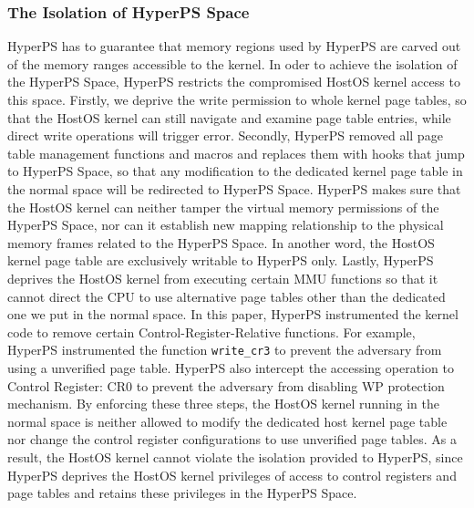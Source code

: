 \subsubsection{The Isolation of HyperPS Space}%
\label{ssub:the_isolation_of_hyperps_space}
HyperPS has to guarantee that memory regions used by HyperPS are carved out of the memory ranges accessible to the kernel.
In oder to achieve the isolation of the HyperPS Space, HyperPS restricts the compromised HostOS kernel access to this space. 
Firstly, we deprive the write permission to whole kernel page tables, 
so that the HostOS kernel can still navigate and examine page table entries, while direct write operations will trigger error. 
Secondly, HyperPS removed all page table management functions and macros and replaces them with hooks that jump to HyperPS Space, so that any modification to the dedicated kernel page table in the normal space will be redirected to HyperPS Space. 
HyperPS makes sure that the HostOS kernel can neither tamper the virtual memory permissions of the HyperPS Space, nor can it establish new mapping relationship to the physical memory frames related to the HyperPS Space. 
In another word, the HostOS kernel page table are exclusively writable to HyperPS only. 
Lastly, HyperPS deprives the HostOS kernel from executing certain MMU functions so that it cannot direct the CPU to use alternative page tables other than the dedicated one we put in the normal space. 
In this paper, HyperPS instrumented the kernel code to remove certain Control-Register-Relative functions. 
For example, HyperPS instrumented the function \verb|write_cr3| to prevent the adversary from using a unverified page table. 
HyperPS also intercept the accessing operation to Control Register: CR0 to prevent the adversary from disabling WP protection mechanism.
By enforcing these three steps, the HostOS kernel running in the normal space is neither allowed to modify the dedicated host kernel page table nor change the control register configurations to use unverified page tables. 
As a result, the HostOS kernel cannot violate the isolation provided to HyperPS, since HyperPS deprives the HostOS kernel privileges of access to control registers and page tables and retains these privileges in the HyperPS Space.

